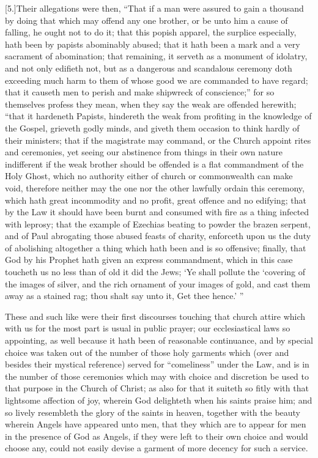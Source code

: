 [5.]Their allegations were then, “That if a man were assured to gain a thousand by doing that which may offend any one brother, or be unto him a cause of falling, he ought not to do it; that this popish apparel, the surplice especially, hath been by papists abominably abused; that it hath been a mark and a very sacrament of abomination; that remaining, it serveth as a monument of idolatry, and not only edifieth not, but as a dangerous and scandalous  ceremony doth exceeding much harm to them of whose good we are commanded to have regard; that it causeth men to perish and make shipwreck of conscience;” for so themselves profess they mean, when they say the weak are offended herewith; “that it hardeneth Papists, hindereth the weak from profiting in the knowledge of the Gospel, grieveth godly minds, and giveth them occasion to think hardly of their ministers; that if the magistrate may command, or the Church appoint rites and ceremonies, yet seeing our abstinence from things in their own nature indifferent if the weak brother should be offended is a flat commandment of the Holy Ghost, which no authority either of church or commonwealth can make void, therefore neither may the one nor the other lawfully ordain this ceremony, which hath great incommodity and no profit, great offence and no edifying; that by the Law it should have been burnt and consumed with fire as a thing infected with leprosy; that the example of Ezechias beating to powder the brazen serpent, and of Paul abrogating those abused feasts of charity, enforceth upon us the duty of abolishing altogether a thing which hath been and is so offensive; finally, that God by his Prophet hath given an express commandment, which in this case toucheth us no less than of old it did the Jews; ‘Ye shall pollute the ‘covering of the images of silver, and the rich ornament of your images of gold, and cast them away as a stained rag; thou shalt say unto it, Get thee hence.’ ”

These and such like were their first discourses touching that church attire which with us for the most part is usual in public prayer; our ecclesiastical laws so appointing, as well because it hath been of reasonable continuance, and by special choice was taken out of the number of those holy garments which (over and besides their mystical reference) served for “comeliness” under the Law, and is in the number of  those ceremonies which may with choice and discretion be used to that purpose in the Church of Christ;
 as also for that it suiteth so fitly with that lightsome affection of joy, wherein God delighteth when his saints praise him; and so lively resembleth the glory of the saints in heaven, together with the beauty wherein Angels have appeared unto men, that they which are to appear for men in the presence of God as Angels, if they were left to their own choice and would choose any, could not easily devise a garment of more decency for such a service.

